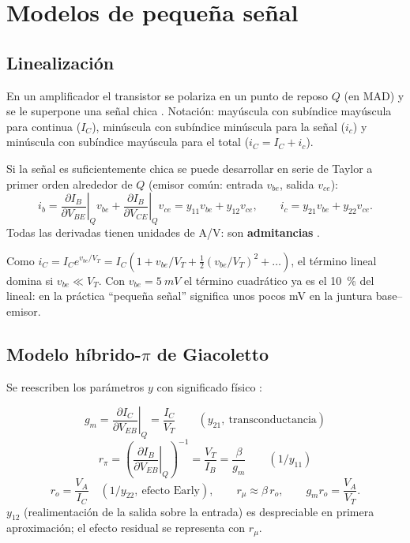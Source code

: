 \section{Modelos de pequeña señal}
\label{sec:pequena-senal}

\subsection{Linealización}

En un amplificador el transistor se polariza en un punto de reposo $Q$ (en MAD) y se le
superpone una señal chica . Notación: mayúscula con subíndice mayúscula
para continua ($I_C$), minúscula con subíndice minúscula para la señal ($i_c$) y minúscula con
subíndice mayúscula para el total ($i_C=I_C+i_c$).

Si la señal es suficientemente chica se puede desarrollar en serie de Taylor a primer orden
alrededor de $Q$ (emisor común: entrada $v_{be}$, salida $v_{ce}$):
\[
  i_b = \left.\frac{\partial I_B}{\partial V_{BE}}\right|_{Q}v_{be}
      + \left.\frac{\partial I_B}{\partial V_{CE}}\right|_{Q}v_{ce}
      = y_{11}v_{be}+y_{12}v_{ce},
  \qquad
  i_c = y_{21}v_{be}+y_{22}v_{ce}.
\]
Todas las derivadas tienen unidades de A/V: son \textbf{admitancias} .

\begin{intuicion}
Como $i_C=I_Ce^{v_{be}/V_T}=I_C(1+v_{be}/V_T+\tfrac12(v_{be}/V_T)^2+\dots)$, el término lineal
domina si $v_{be}\ll V_T$. Con $v_{be}=\SI{5}{mV}$ el término cuadrático ya es el
\SI{10}{\percent} del lineal: en la práctica ``pequeña señal'' significa unos pocos mV en la
juntura base--emisor.
\end{intuicion}

\subsection{Modelo híbrido-\texorpdfstring{$\pi$}{pi} de Giacoletto}

Se reescriben los parámetros $y$ con significado físico :

\begin{clave}
\[
  g_m = \left.\frac{\partial I_C}{\partial V_{EB}}\right|_Q = \frac{I_C}{V_T}
  \qquad(y_{21},\ \text{transconductancia})
\]
\[
  r_\pi = \left(\left.\frac{\partial I_B}{\partial V_{EB}}\right|_Q\right)^{-1}
        = \frac{V_T}{I_B} = \frac{\beta}{g_m}
  \qquad(1/y_{11})
\]
\[
  r_o = \frac{V_A}{I_C}\quad(1/y_{22},\ \text{efecto Early}),
  \qquad
  r_\mu\approx\beta\,r_o,
  \qquad
  g_mr_o = \frac{V_A}{V_T}.
\]
$y_{12}$ (realimentación de la salida sobre la entrada) es despreciable en primera aproximación;
el efecto residual se representa con $r_\mu$.
\end{clave}


